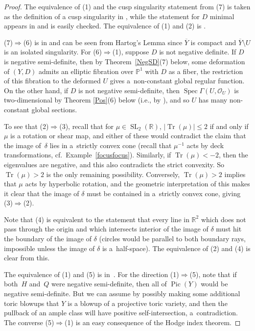 \documentclass[pdftex]{sigma}
\numberwithin{equation}{section}
\numberwithin{figure}{section}
\numberwithin{table}{section}
\DeclareMathOperator{\Pic}{Pic}
\DeclareMathOperator{\Spec}{Spec}
\DeclareMathOperator{\Tr}{Tr}
\DeclareMathOperator{\SL}{SL}
\let\?=\overline
\let\bb=\mathbb
\let\s=\mathcal
\theoremstyle{definition}
\begin{document}
\begin{proof}The equivalence of (1) and the cusp singularity statement from (7) is taken as the definition of a cusp singularity in \cite{GHK1}, while the statement for $D$ minimal appears in \cite[Example~1.10]{GHK1} and is easily checked. The equivalence of (1) and (2) is \cite[Lemma~1.5, arXiv v1]{GHK1}.

(7)$\Rightarrow$(6) is in \cite{GHK2} and can be seen from Hartog's Lemma since $\?{Y}$ is compact and $\?{Y}\setminus U$ is an isolated singularity. For (6)$\Rightarrow$(1), suppose $D$ is not negative definite. If $D$ is negative semi-definite, then by Theorem~\ref{NegSD}(7) below, some deformation of $(Y,D)$ admits an elliptic fibration over $\bb{P}^1$ with $D$ as a fiber, the restriction of this fibration to the deformed $U$ gives a~non-constant global regular function. On the other hand, if $D$ is not negative semi-definite, then $\Spec \Gamma(U,\s{O}_U)$ is two-dimensional by Theorem \ref{Pos}(6) below (i.e., by \cite[Lemma~6.9]{GHK1}), and so $U$ has many non-constant global sections.

To see that (2)$\Rightarrow$(3), recall that for $\mu \in \SL_2(\bb{R})$, $|\Tr(\mu)|\leq 2$ if and only if $\mu$ is a rotation or shear map, and either of these would contradict the claim that the image of~$\delta$ lies in a~strictly convex cone (recall that $\mu^{-1}$ acts by deck transformations, cf.\ Example~\ref{focusfocus}). Similarly, if \mbox{$\Tr(\mu)<-2$}, then the eigenvalues are negative, and this also contradicts the strict convexity. So $\Tr(\mu)>2$ is the only remaining possibility. Conversely, $\Tr(\mu)>2$ implies that $\mu$ acts by hyperbolic rotation, and the geometric interpretation of this makes it clear that the image of $\delta$ must be contained in a~strictly convex cone, giving (3)$\Rightarrow$(2).

Note that (4) is equivalent to the statement that every line in $\bb{R}^2$ which does not pass through the origin and which intersects interior of the image of $\delta$ must hit the boundary of the image of $\delta$ (circles would be parallel to both boundary rays, impossible unless the image of $\delta$ is a~half-space). The equivalence of (2) and (4) is clear from this.

The equivalence of (1) and (5) is in~\cite{GHK2}. For the direction (1)$\Rightarrow$(5), note that if both~$H$ and~$Q$ were negative semi-definite, then all of $\Pic(Y)$ would be negative semi-definite. But we can assume by possibly making some additional toric blowups that $Y$ is a blowup of a projective toric variety, and then the pullback of an ample class will have positive self-intersection, a~contradiction. The converse (5)$\Rightarrow$(1) is an easy consequence of the Hodge index theorem.
\end{proof}
\end{document}
